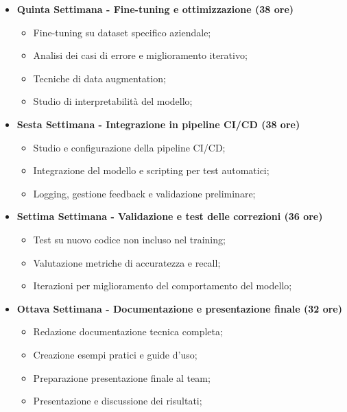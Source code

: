 {\begin{itemize}
\begin{itemize}
        \end{itemize}
        \item \textbf{Quinta Settimana - Fine-tuning e ottimizzazione (38 ore)} 
        \begin{itemize}
            \item Fine-tuning su dataset specifico aziendale;
            \item Analisi dei casi di errore e miglioramento iterativo;
            \item Tecniche di data augmentation;
            \item Studio di interpretabilità del modello;
        \end{itemize}
        \item \textbf{Sesta Settimana - Integrazione in pipeline CI/CD (38 ore)} 
        \begin{itemize}
            \item Studio e configurazione della pipeline CI/CD;
            \item Integrazione del modello e scripting per test automatici;
            \item Logging, gestione feedback e validazione preliminare;
        \end{itemize}
        \item \textbf{Settima Settimana - Validazione e test delle correzioni (36 ore)} 
        \begin{itemize}
            \item Test su nuovo codice non incluso nel training;
            \item Valutazione metriche di accuratezza e recall;
            \item Iterazioni per miglioramento del comportamento del modello;
        \end{itemize}
        \item \textbf{Ottava Settimana - Documentazione e presentazione finale (32 ore)} 
        \begin{itemize}
            \item Redazione documentazione tecnica completa;
            \item Creazione esempi pratici e guide d’uso;
            \item Preparazione presentazione finale al team;
            \item Presentazione e discussione dei risultati;
        \end{itemize}
    \end{itemize}
}

\newcommand{\totaleOre}{}